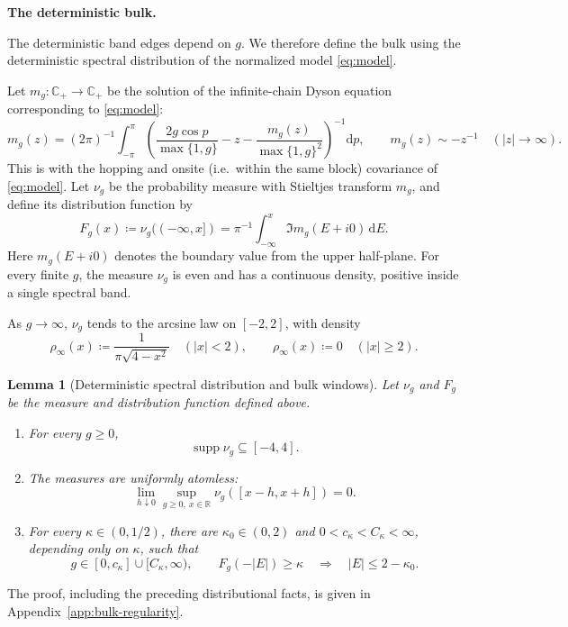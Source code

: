 \documentclass[11pt]{article}
\numberwithin{equation}{section}
\newtheorem{lemma}[theorem]{Lemma}
\theoremstyle{remark}
\newcommand{\C}{\mathbb C}
\newcommand{\R}{\mathbb R}
\newcommand{\supp}{\operatorname{supp}}
\begin{document}
\medskip\noindent\textbf{The deterministic bulk.}

The deterministic band edges depend on $g$. We therefore define the
bulk using the deterministic spectral distribution of the normalized
model \eqref{eq:model}.

Let \(m_g:\C_+\to\C_+\) be the solution of the infinite-chain
Dyson equation corresponding to \eqref{eq:model}:
\begin{equation}\label{eq:dyson}
 m_g(z)=(2\pi)^{-1}\int_{-\pi}^{\pi}
 \left(\dfrac{2g\cos p}{\max\{1,g\}}-z
                  -\dfrac{m_g(z)}{\max\{1,g\}^2}\right)^{-1}\mathrm dp,
 \qquad m_g(z)\sim-z^{-1}\quad(|z|\to\infty).
\end{equation}
This is \cite[(2.6)]{TYY} with the hopping and onsite (i.e.\ within the same block) covariance of
\eqref{eq:model}. Let $\nu_g$ be the probability measure with
Stieltjes transform $m_g$, and define its distribution function by
\begin{equation}\label{eq:distribution}
 F_g(x)\coloneqq \nu_g(({-\infty},x])
       =\pi^{-1}\int_{-\infty}^x\Im m_g(E+i0)\,\mathrm dE.
\end{equation}
Here $m_g(E+i0)$ denotes the boundary value from the upper half-plane.
For every finite $g$, the measure $\nu_g$ is even and has a continuous
density, positive inside a single spectral band.

As $g\to\infty$, $\nu_g$ tends to the arcsine law on $[-2,2]$,
with density
\begin{equation}\label{eq:arcsine}
 \rho_\infty(x)\coloneqq \frac1{\pi\sqrt{4-x^2}}\quad (|x|<2),
 \qquad \rho_\infty(x)\coloneqq 0\quad (|x|\ge2).
\end{equation}
\begin{lemma}[Deterministic spectral distribution and bulk windows]
\label{da:lem:distribution}
Let $\nu_g$ and $F_g$ be the measure and distribution function defined above.
\begin{enumerate}
\item[(i)] For every $g\ge0$,
\begin{equation}\label{eq:bounded-physical-bulk}
 \supp\nu_g\subseteq[-4,4].
\end{equation}
\item[(ii)] The measures are uniformly atomless:
\begin{equation}\label{rd:eq:noatoms}
 \lim_{h\downarrow0}\sup_{g\ge0,\ x\in\R}\nu_g([x-h,x+h])=0.
\end{equation}
\item[(iii)] For every $\kappa\in(0,1/2)$, there are
$\kappa_0\in(0,2)$ and $0<c_\kappa<C_\kappa<\infty$, depending only on
$\kappa$, such that
\begin{equation}\label{eq:bulk-bridge}
 g\in[0,c_\kappa]\cup[C_\kappa,\infty),\qquad F_g(-|E|)\ge\kappa
 \quad\Longrightarrow\quad |E|\le2-\kappa_0.
\end{equation}
\end{enumerate}
\end{lemma}
The proof, including the preceding distributional facts, is given in
Appendix~\ref{app:bulk-regularity}.
\end{document}
